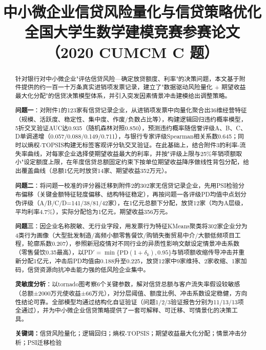 \documentclass[12pt, a4paper]{article}
\title{
    \vspace{-1cm}
    {\Large \textbf{中小微企业信贷风险量化与信贷策略优化}} \\[0.5em]
    {\large 全国大学生数学建模竞赛参赛论文（2020 CUMCM C 题）}
}
\author{}
\date{}
\begin{document}
\setcounter{page}{1}

\maketitle
\thispagestyle{plain}

\begin{abstract}
\noindent
针对银行对中小微企业"评估信贷风险—确定放贷额度、利率"的决策问题，本文基于附件提供的约一百一十万条真实进销项发票记录，建立了"数据驱动风险量化 + 期望收益最大化分配"的信贷决策模型体系，并引入突发因素情景冲击建模给出调整策略。

\textbf{问题一}：对附件1的123家有信贷记录企业，从进销项发票中向量化聚合出36维经营特征（规模、活跃度、稳定性、集中度、作废/负数占比等），构建逻辑回归违约概率模型，5折交叉验证AUC达0.935（随机森林对照0.850），预测违约概率随信誉评级A、B、C、D单调递增（0.057/0.088/0.149/0.711），与银行专家评级Spearman相关系数0.645；同时以熵权-TOPSIS构建无标签客观评分轨交叉验证。在此基础上，结合附件3的利率-流失率曲线，对每家企业选择使期望收益最大的利率，并按"评级上限与25\%年销项额取小"设定额度上限，在年度信贷总额固定约束下按单位期望收益降序做线性背包分配，给出覆盖曲线（总额1亿元时放贷14家、期望收益352万元）。

\textbf{问题二}：将问题一校准的评分器迁移到附件2的302家无信贷记录企业，先用PSI检验分布偏移（关键金额特征轻度偏移、结构特征稳定），再按问题一各评级PD均值中点划分伪评级（A/B/C/D=141/38/81/42家），在1亿元总额下分配，放贷12家（均为A层级，平均利率4.7\%），实际分配恰为1亿元，期望收益356万元。

\textbf{问题三}：因企业名称脱敏、无行业字段，用发票行为特征KMeans聚类将302家企业分为4类行为画像（大型批发制造/高频小额零售餐饮/购销失衡贸易中介/大额低频项目工程，轮廓系数0.207），参照新冠疫情对不同行业的异质性影响文献设定情景冲击系数（零售餐饮0.35最高），以PD$'=\min\{\text{PD}(1+\delta_k),0.95\}$与销项额收缩传导冲击并重新分配1亿元，冲击后PD均值由0.188升至0.225，放贷12家中9家维持、2家收缩、1家加码，信贷资源向抗冲击能力强的低风险企业集中。

\textbf{灵敏度分析}：以tornado图考察6个关键参数，解对信贷总额与客户流失率假设较敏感（总额±2000万元使收益±66万元），对分层阈值、额度比例、冲击系数设定稳健，方向性结论可靠。全部模型均通过结构化自证验证（问题1/2/3验证报告分别为11/13/13项全通过），并为中小微企业信贷策略提供了一套可解释、可迁移、可情景化的决策工具。

\vspace{1em}
\noindent\textbf{关键词：}信贷风险量化；逻辑回归；熵权-TOPSIS；期望收益最大化分配；情景冲击分析；PSI迁移检验
\end{abstract}
\end{document}
